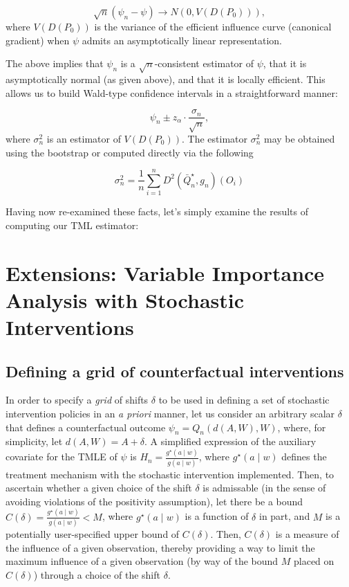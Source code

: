 \documentclass[12pt, krantz2,]{book}
\theoremstyle{definition}
\theoremstyle{definition}
\theoremstyle{definition}
\newcommand{\1}{\mathbbm{1}}
\begin{document}
\[\sqrt{n}(\psi_n - \psi) \to N(0, V(D(P_0))),\]
where \(V(D(P_0))\) is the variance of the efficient influence curve (canonical
gradient) when \(\psi\) admits an asymptotically linear representation.

The above implies that \(\psi_n\) is a \(\sqrt{n}\)-consistent estimator of \(\psi\),
that it is asymptotically normal (as given above), and that it is locally
efficient. This allows us to build Wald-type confidence intervals in a
straightforward manner:

\[\psi_n \pm z_{\alpha} \cdot \frac{\sigma_n}{\sqrt{n}},\]
where \(\sigma_n^2\) is an estimator of \(V(D(P_0))\). The estimator \(\sigma_n^2\)
may be obtained using the bootstrap or computed directly via the following

\[\sigma_n^2 = \frac{1}{n} \sum_{i = 1}^{n} D^2(\bar{Q}_n^{\star}, g_n)(O_i)\]

Having now re-examined these facts, let's simply examine the results of
computing our TML estimator:

\hypertarget{extensions-variable-importance-analysis-with-stochastic-interventions}{%
\section{Extensions: Variable Importance Analysis with Stochastic Interventions}\label{extensions-variable-importance-analysis-with-stochastic-interventions}}

\hypertarget{defining-a-grid-of-counterfactual-interventions}{%
\subsection{Defining a grid of counterfactual interventions}\label{defining-a-grid-of-counterfactual-interventions}}

In order to specify a \emph{grid} of shifts \(\delta\) to be used in defining a set of
stochastic intervention policies in an \emph{a priori} manner, let us consider an
arbitrary scalar \(\delta\) that defines a counterfactual outcome \(\psi_n = Q_n(d(A, W), W)\), where, for simplicity, let \(d(A, W) = A + \delta\). A
simplified expression of the auxiliary covariate for the TMLE of \(\psi\) is
\(H_n = \frac{g^{\star}(a \mid w)}{g(a \mid w)}\), where \(g^{\star}(a \mid w)\)
defines the treatment mechanism with the stochastic intervention implemented.
Then, to ascertain whether a given choice of the shift \(\delta\) is admissable
(in the sense of avoiding violations of the positivity assumption), let there
be a bound \(C(\delta) = \frac{g^{\star}(a \mid w)}{g(a \mid w)} < M\), where
\(g^{\star}(a \mid w)\) is a function of \(\delta\) in part, and \(M\) is a potentially
user-specified upper bound of \(C(\delta)\). Then, \(C(\delta)\) is a measure of
the influence of a given observation, thereby providing a way to limit the
maximum influence of a given observation (by way of the bound \(M\) placed on
\(C(\delta)\)) through a choice of the shift \(\delta\).
\end{document}
